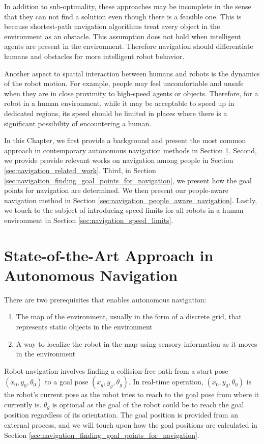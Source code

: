 \documentclass[12pt]{gatech-thesis}
\begin{document}
In addition to sub-optimality, these approaches may be incomplete in the sense that they can not find a solution even though there is a feasible one. This is because shortest-path navigation algorithms treat every object in the environment as an obstacle. This assumption does not hold when intelligent agents are present in the environment. Therefore navigation should differentiate humans and obstacles for more intelligent robot behavior.

Another aspect to spatial interaction between humans and robots is the dynamics of the robot motion. For example, people may feel uncomfortable and unsafe when they are in close proximity to high-speed agents or objects. Therefore, for a robot in a human environment, while it may be acceptable to speed up in dedicated regions, its speed should be limited in places where there is a significant possibility of encountering a human.

In this Chapter, we first provide a background and present the most common approach in contemporary autonomous navigation methods in Section \ref{sec:navigation_contemporary_navigation_practices}. Second, we provide provide relevant works on navigation among people in Section \ref{sec:navigation_related_work}. Third, in Section \ref{sec:navigation_finding_goal_points_for_navigation}, we present how the goal points for navigation are determined. We then present our people-aware navigation method in Section \ref{sec:navigation_people_aware_navigation}. Lastly, we touch to the subject of introducing speed limits for all robots in a human environment in Section \ref{sec:navigation_speed_limits}.


\section{State-of-the-Art Approach in Autonomous Navigation}
\label{sec:navigation_contemporary_navigation_practices}

There are two prerequisites that enables autonomous navigation: 

\begin{enumerate}
\item The map of the environment, usually in the form of a discrete grid, that represents static objects in the environment
\item A way to localize the robot in the map using sensory information as it moves in the environment
\end{enumerate}

Robot navigation involves finding a collision-free path from a start pose $(x_{0},y_{0},\theta_0)$ to a goal pose $(x_{g},y_{g},\theta_g)$. In real-time operation, $(x_{0},y_{0}, \theta_0)$ is the robot's current pose as the robot tries to reach to the goal pose from where it currently is. $\theta_g$ is optional as the goal of the robot could be to reach the goal position regardless of its orientation. The goal position is provided from an external process, and we will touch upon how the goal positions are calculated in Section \ref{sec:navigation_finding_goal_points_for_navigation}.
\end{document}
